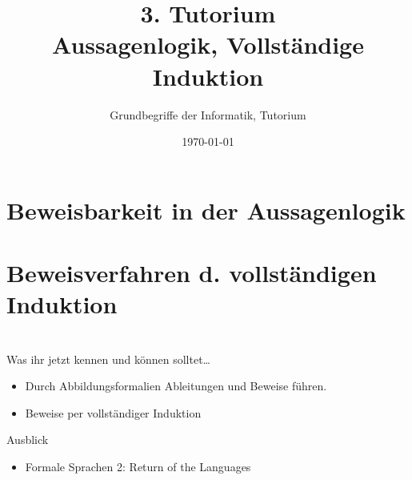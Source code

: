 




\title[Aussagenlogik, Vollständige Induktion]{3. Tutorium\\ Aussagenlogik, Vollständige Induktion}
\subtitle{Grundbegriffe der Informatik, Tutorium \hashtag\mytutnumber}
\date{\today}
\usepackage{tikz}


\titleframe




\roadmap

\section{Beweisbarkeit in der Aussagenlogik}




\section[Vollständige Induktion]{Beweisverfahren d. vollständigen Induktion}







\section{}
	\begin{frame}{Was ihr jetzt kennen und können solltet\dots}
			\begin{itemize}
				\item Durch Abbildungsformalien Ableitungen und Beweise führen.
				\item Beweise per vollständiger Induktion
			\end{itemize}
	
	\end{frame}
\begin{frame}[fragile]{Ausblick}
 		\begin{itemize}
 			\item Formale Sprachen 2: Return of the Languages
 		\end{itemize}
\end{frame}
\section{}
\questionframe
\lastframe
{}
